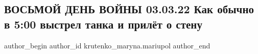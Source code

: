  
 
 
 
 

\subsection{ВОСЬМОЙ ДЕНЬ ВОЙНЫ 03.03.22 Как обычно в 5:00 выстрел танка и прилёт о стену}
\label{sec:03_03_2023.fb.krutenko_maryna.mariupol.1.vosmoj_den_03_03_vystrel_tanka_prilet_v_stenu}

\ifcmt
 author_begin
   author_id krutenko_maryna.mariupol
 author_end
\fi
